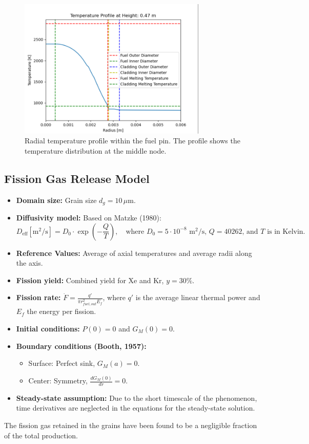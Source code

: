 \documentclass[11pt,a4paper,twoside]{article}
\begin{document}
\begin{figure}[H]
    \centering
    \includegraphics[width=0.8\textwidth]{temperature_profile.png}
    \caption{Radial temperature profile within the fuel pin. The profile shows the temperature distribution at the middle node.}
    \label{fig:Temperature_Profile}
\end{figure}

\subsection{Fission Gas Release Model}
\begin{itemize}
    \item \textbf{Domain size:} Grain size $d_g = 10 \, \mu \text{m}$.
    \item \textbf{Diffusivity model:} Based on Matzke (1980):
    \[
    D_{\text{eff}} [\text{m}^2/\text{s}] = D_0 \cdot \exp\left(-\frac{Q}{T}\right), \quad \text{where } D_0 = 5 \cdot 10^{-8} \text{ m}^2/\text{s}, \, Q = 40262 \text{, and } T \text{ is in Kelvin.}
    \]
    \item \textbf{Reference Values:} Average of axial temperatures and average radii along the axis.
    \item \textbf{Fission yield:} Combined yield for Xe and Kr, $y = 30\%$.
    \item \textbf{Fission rate:} $\dot{F} = \frac{q'}{\pi r_{fuel,out}^2 E_f }$, where $q'$ is the average linear thermal power and $E_f$ the energy per fission.
    \item \textbf{Initial conditions:} $P(0) = 0$ and $G_M(0) = 0$.
    \item \textbf{Boundary conditions (Booth, 1957):}
    \begin{itemize}
        \item Surface: Perfect sink, $G_M(a) = 0$.
        \item Center: Symmetry, $\frac{dG_M(0)}{dr} = 0$.
    \end{itemize}
    \item \textbf{Steady-state assumption:} Due to the short timescale of the phenomenon, time derivatives are neglected in the equations for the steady-state solution.
\end{itemize}
The fission gas retained in the grains have been found to be a negligible fraction of the total production.
    
\end{document}
